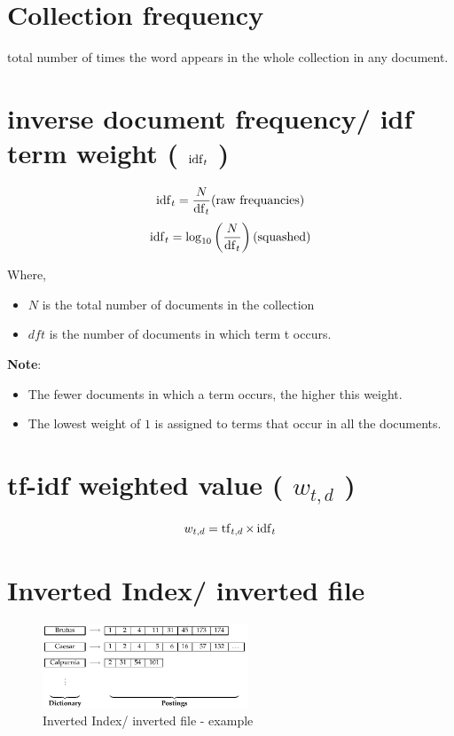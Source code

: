 \section{Collection frequency \cite{nlp-1}}\label{Collection frequency}
total number of times the word appears in the whole collection in any document.


\section{inverse document frequency/ idf term weight ( $\operatorname{idf}_t$ )}\label{inverse document frequency/ idf term weight}
\[
    \rcmdXidf_t = \displaystyle\frac{N}{\rcmdXdf_t} \hfill \text{(raw frequancies)}
\]
\[
    \rcmdXidf_t = \log_{10} \left(\displaystyle\frac{N}{\rcmdXdf_t} \right) \hfill \text{(squashed)}
\]

Where,
\begin{itemize}
    \item $N$ is the total number of documents in the collection
    \item $dft$ is the number of documents in which term t occurs.
\end{itemize}

\vspace{0.2cm}
\textbf{Note}:
\begin{itemize}
    \item The fewer documents in which a term occurs, the higher this weight.

    \item The lowest weight of $1$ is assigned to terms that occur in all the documents.

    
\end{itemize}


\section{tf-idf weighted value ( $w_{t,d}$ ) \cite{nlp-1}}\label{tf-idf weighted value: formula}
\[
    w_{t,d} = \operatorname{tf}_{t,d} \times\operatorname{idf}_t
\]

\section{Inverted Index/ inverted file \cite{ir-1}}\label{Inverted Index/ inverted file}

\begin{figure}[h]
    \centering
    \includegraphics[width=\linewidth, height=2.5cm, keepaspectratio]{Pictures/info-retrieval/inverted-index.png}
    \caption{Inverted Index/ inverted file - example}
\end{figure}

